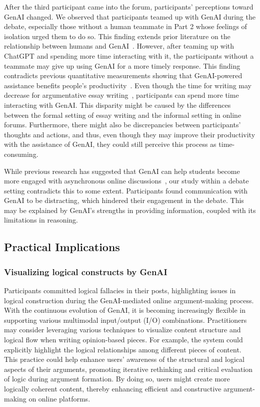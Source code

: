 After the third participant came into the forum, participants' perceptions toward GenAI changed. We observed that participants teamed up with GenAI during the debate, especially those without a human teammate in Part 2 whose feelings of isolation urged them to do so. This finding extends prior literature on the relationship between humans and GenAI~\cite{han_when_2024}. However, after teaming up with ChatGPT and spending more time interacting with it, the participants without a teammate may give up using GenAI for a more timely response. This finding contradicts previous quantitative measurements showing that GenAI-powered assistance benefits people's productivity~\cite{li_value_2024}. Even though the time for writing may decrease for argumentative essay writing~\cite{li_value_2024}, participants can spend more time interacting with GenAI. This disparity might be caused by the differences between the formal setting of essay writing and the informal setting in online forums. Furthermore, there might also be discrepancies between participants' thoughts and actions, and thus, even though they may improve their productivity with the assistance of GenAI, they could still perceive this process as time-consuming.

While previous research has suggested that GenAI can help students become more engaged with asynchronous online discussions~\cite{lin_case_2024}, our study within a debate setting contradicts this to some extent. Participants found communication with GenAI to be distracting, which hindered their engagement in the debate. This may be explained by GenAI's strengths in providing information, coupled with its limitations in reasoning.

\subsection{Practical Implications}

\subsubsection{Visualizing logical constructs by GenAI}
Participants committed logical fallacies in their posts, highlighting issues in logical construction during the GenAI-mediated online argument-making process. With the continuous evolution of GenAI, it is becoming increasingly flexible in supporting various multimodal input/output (I/O) combinations. Practitioners may consider leveraging various techniques to visualize content structure and logical flow when writing opinion-based pieces. For example, the system could explicitly highlight the logical relationships among different pieces of content. This practice could help enhance users' awareness of the structural and logical aspects of their arguments, promoting iterative rethinking and critical evaluation of logic during argument formation. By doing so, users might create more logically coherent content, thereby enhancing efficient and constructive argument-making on online platforms.

